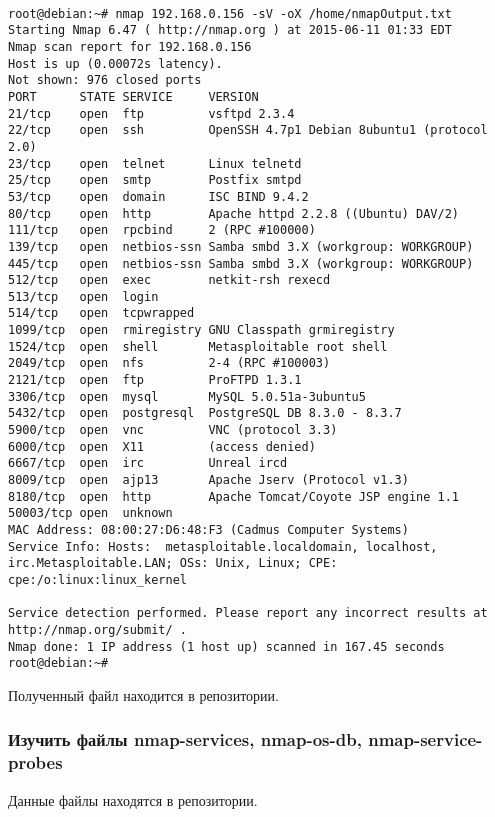 \documentclass[10pt,a4paper]{article}
\begin{document}
\begin{verbatim}

root@debian:~# nmap 192.168.0.156 -sV -oX /home/nmapOutput.txt
Starting Nmap 6.47 ( http://nmap.org ) at 2015-06-11 01:33 EDT
Nmap scan report for 192.168.0.156
Host is up (0.00072s latency).
Not shown: 976 closed ports
PORT      STATE SERVICE     VERSION
21/tcp    open  ftp         vsftpd 2.3.4
22/tcp    open  ssh         OpenSSH 4.7p1 Debian 8ubuntu1 (protocol 2.0)
23/tcp    open  telnet      Linux telnetd
25/tcp    open  smtp        Postfix smtpd
53/tcp    open  domain      ISC BIND 9.4.2
80/tcp    open  http        Apache httpd 2.2.8 ((Ubuntu) DAV/2)
111/tcp   open  rpcbind     2 (RPC #100000)
139/tcp   open  netbios-ssn Samba smbd 3.X (workgroup: WORKGROUP)
445/tcp   open  netbios-ssn Samba smbd 3.X (workgroup: WORKGROUP)
512/tcp   open  exec        netkit-rsh rexecd
513/tcp   open  login
514/tcp   open  tcpwrapped
1099/tcp  open  rmiregistry GNU Classpath grmiregistry
1524/tcp  open  shell       Metasploitable root shell
2049/tcp  open  nfs         2-4 (RPC #100003)
2121/tcp  open  ftp         ProFTPD 1.3.1
3306/tcp  open  mysql       MySQL 5.0.51a-3ubuntu5
5432/tcp  open  postgresql  PostgreSQL DB 8.3.0 - 8.3.7
5900/tcp  open  vnc         VNC (protocol 3.3)
6000/tcp  open  X11         (access denied)
6667/tcp  open  irc         Unreal ircd
8009/tcp  open  ajp13       Apache Jserv (Protocol v1.3)
8180/tcp  open  http        Apache Tomcat/Coyote JSP engine 1.1
50003/tcp open  unknown
MAC Address: 08:00:27:D6:48:F3 (Cadmus Computer Systems)
Service Info: Hosts:  metasploitable.localdomain, localhost, irc.Metasploitable.LAN; OSs: Unix, Linux; CPE: cpe:/o:linux:linux_kernel

Service detection performed. Please report any incorrect results at http://nmap.org/submit/ .
Nmap done: 1 IP address (1 host up) scanned in 167.45 seconds
root@debian:~# 

\end{verbatim}

Полученный файл находится в репозитории.

\subsubsection{Изучить файлы nmap-services, nmap-os-db, nmap-service-probes}

Данные файлы находятся в репозитории.
\end{document}

